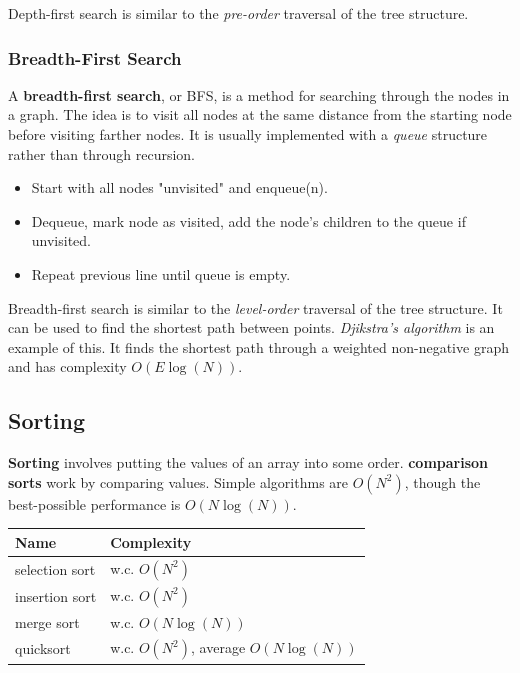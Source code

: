 Depth-first search is similar to the \textit{pre-order} traversal of the tree structure. 

\subsubsection{Breadth-First Search}

A \textbf{breadth-first search}, or BFS, is a method for searching through the nodes in a graph. The idea is to visit all nodes at the same distance from the starting node before visiting farther nodes. It is usually implemented with a \textit{queue} structure rather than through recursion. 

\begin{itemize}
	\item Start with all nodes "unvisited" and enqueue(n). 
	\item Dequeue, mark node as visited, add the node's children to the queue if unvisited. 
	\item Repeat previous line until queue is empty. 
\end{itemize}

Breadth-first search is similar to the \textit{level-order} traversal of the tree structure. It can be used to find the shortest path between points. \textit{Djikstra's algorithm} is an example of this. It finds the shortest path through a weighted non-negative graph and has complexity $O(E \log(N))$.

\subsection{Sorting}

\textbf{Sorting} involves putting the values of an array into some order. \textbf{comparison sorts} work by comparing values. Simple algorithms are $O(N^{2})$, though the best-possible performance is $O(N\log(N))$. \\

\begin{tabular}{p{}p{}}
Name & Complexity \\
\hline
selection sort & w.c. $O(N^{2})$ \\
insertion sort & w.c. $O(N^{2})$ \\
merge sort & w.c. $O(N \log(N))$ \\
quicksort & w.c. $O(N^{2})$, average $O(N \log(N))$ \\
\end{tabular} \\


